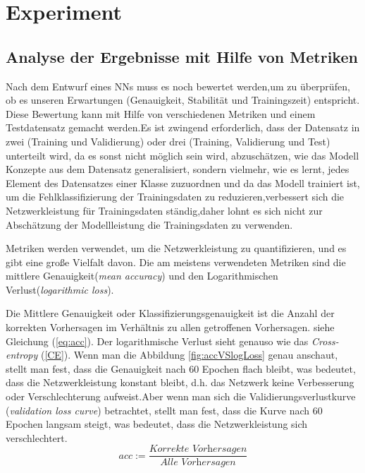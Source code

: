 \documentclass[12pt,a4paper]{scrartcl}
\numberwithin{equation}{section}
\begin{document}
\section{Experiment} \label{Experiment}

\subsection{Analyse der Ergebnisse mit Hilfe von Metriken}
Nach dem Entwurf eines \acsp{NN} muss es noch bewertet werden,um zu überprüfen, ob es unseren Erwartungen (Genauigkeit, Stabilität und Trainingszeit) entspricht. Diese Bewertung kann mit Hilfe von verschiedenen Metriken und einem Testdatensatz gemacht werden.Es ist zwingend erforderlich, dass der Datensatz in zwei (Training und Validierung) oder drei (Training, Validierung und Test) unterteilt wird, da es sonst nicht möglich sein wird, abzuschätzen, wie das Modell Konzepte aus dem Datensatz generalisiert, sondern vielmehr, wie es lernt, jedes Element des Datensatzes einer Klasse zuzuordnen und da das Modell trainiert ist, um die Fehlklassifizierung der Trainingsdaten zu reduzieren,verbessert sich die Netzwerkleistung für Trainingsdaten ständig,daher lohnt es sich nicht zur Abschätzung der Modellleistung die Trainingsdaten zu verwenden.

Metriken werden verwendet, um die Netzwerkleistung zu quantifizieren, und es gibt eine große Vielfalt davon. Die am meistens verwendeten Metriken sind  die mittlere Genauigkeit(\textit{mean accuracy}) und den Logarithmischen Verlust(\textit{logarithmic loss}).

Die Mittlere Genauigkeit oder Klassifizierungsgenauigkeit ist die Anzahl der korrekten Vorhersagen im Verhältnis zu allen getroffenen Vorhersagen. siehe Gleichung (\ref{eq:acc}).
Der logarithmische Verlust sieht genauso wie das \textit{Cross-entropy} (\ref{CE}). Wenn man die Abbildung \ref{fig:accVSlogLoss} genau anschaut, stellt man fest, dass die Genauigkeit nach 60 Epochen flach bleibt, was bedeutet, dass die Netzwerkleistung konstant bleibt, d.h. das Netzwerk keine Verbesserung oder Verschlechterung aufweist.Aber wenn man sich die Validierungsverlustkurve  (\textit{validation loss curve}) betrachtet, stellt man fest, dass die Kurve nach 60 Epochen langsam steigt, was bedeutet, dass die Netzwerkleistung sich verschlechtert.
\begin{equation}\label{eq:acc}
	acc := \dfrac{\textit{Korrekte Vorhersagen}}{\textit{Alle Vorhersagen}}
\end{equation}
\end{document}
